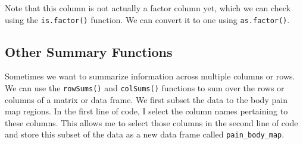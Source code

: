 \documentclass[
  letterpaper,
]{krantz}
\makeatletter
\newenvironment{Shaded}{\begin{snugshade}}{\end{snugshade}}
\newcommand{\CommentTok}[1]{\textcolor[rgb]{0.37,0.37,0.37}{#1}}
\newcommand{\FunctionTok}[1]{\textcolor[rgb]{0.28,0.35,0.67}{#1}}
\newcommand{\NormalTok}[1]{\textcolor[rgb]{0.00,0.23,0.31}{#1}}
\newcommand{\OtherTok}[1]{\textcolor[rgb]{0.00,0.23,0.31}{#1}}
\newcommand{\SpecialCharTok}[1]{\textcolor[rgb]{0.37,0.37,0.37}{#1}}
\newenvironment{kframe}{%
\medskip{}
\setlength{\fboxsep}{.8em}
 \def\at@end@of@kframe{}%
 \ifinner\ifhmode%
  \def\at@end@of@kframe{\end{minipage}}%
  \begin{minipage}{\columnwidth}%
 \fi\fi%
 \def\FrameCommand##1{\hskip\@totalleftmargin \hskip-\fboxsep
 \colorbox{shadecolor}{##1}\hskip-\fboxsep
     \hskip-\linewidth \hskip-\@totalleftmargin \hskip\columnwidth}%
 \MakeFramed {\advance\hsize-\width
   \@totalleftmargin\z@ \linewidth\hsize
   \@setminipage}}%
 {\par\unskip\endMakeFramed%
 \at@end@of@kframe}
\renewenvironment{Shaded}{\begin{kframe}}{\end{kframe}}
\makeatother
\begin{document}
\begin{Shaded}
\end{Shaded}

Note that this column is not actually a factor column yet, which we can
check using the \texttt{is.factor()} function. We can convert it to one
using \texttt{as.factor()}.

\begin{Shaded}
\end{Shaded}

\begin{Shaded}
\end{Shaded}

\subsection{Other Summary Functions}\label{other-summary-functions}

Sometimes we want to summarize information across multiple columns or
rows. We can use the \texttt{rowSums()} and \texttt{colSums()} functions
to sum over the rows or columns of a matrix or data frame. We first
subset the data to the body pain map regions. In the first line of code,
I select the column names pertaining to these columns. This allows me to
select those columns in the second line of code and store this subset of
the data as a new data frame called \texttt{pain\_body\_map}.
\end{document}
